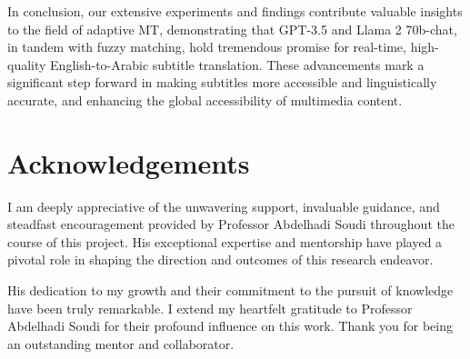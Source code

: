 \documentclass[twocolumn]{article}
\begin{document}
In conclusion, our extensive experiments and findings contribute valuable insights to the field of adaptive MT, demonstrating that GPT-3.5 and Llama 2 70b-chat, in tandem with fuzzy matching, hold tremendous promise for real-time, high-quality English-to-Arabic subtitle translation. These advancements mark a significant step forward in making subtitles more accessible and linguistically accurate, and enhancing the global accessibility of multimedia content.

\section{Acknowledgements}
I am deeply appreciative of the unwavering support, invaluable guidance, and steadfast encouragement provided by Professor Abdelhadi Soudi throughout the course of this project. His exceptional expertise and mentorship have played a pivotal role in shaping the direction and outcomes of this research endeavor.

His dedication to my growth and their commitment to the pursuit of knowledge have been truly remarkable. I extend my heartfelt gratitude to Professor Abdelhadi Soudi for their profound influence on this work. Thank you for being an outstanding mentor and collaborator.



%
%
%
%
%
\end{document}
